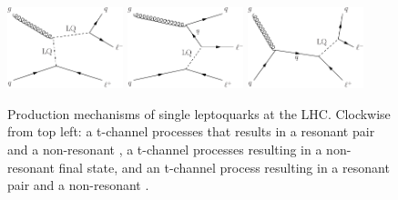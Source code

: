 \begin{figure}[H]
    \centering
    \includegraphics[width=0.3\textwidth]{Images/Theory/SingleLQProdT1.pdf}\hspace{0.1\textwidth}
    \includegraphics[width=0.3\textwidth]{Images/Theory/SingleLQProdT2.pdf}\vspace{0.05\textwidth}
    \includegraphics[width=0.3\textwidth]{Images/Theory/SingleLQProdS1.pdf}\vspace{0.05\textwidth}
    \caption{Production mechanisms of single leptoquarks at the LHC. Clockwise from top left: a t-channel processes that results in a resonant \HepProcess{\Pquark\Plepton} pair and a non-resonant \Plepton, a t-channel processes resulting in a non-resonant \HepProcess{\Plepton\Plepton\Pquark} final state, and an t-channel process resulting in a resonant \HepProcess{\Pquark\Plepton} pair and a non-resonant \Plepton.}
    \label{fig:LQsingleprod}
\end{figure}

